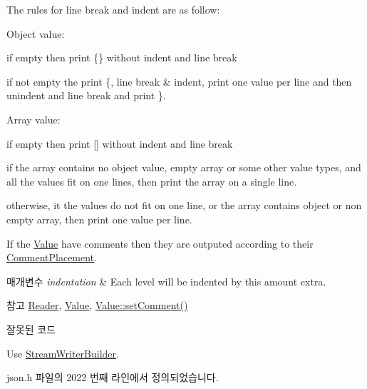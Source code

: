 The rules for line break and indent are as follow\+:
\begin{DoxyItemize}
\item Object value\+:
\begin{DoxyItemize}
\item if empty then print \{\} without indent and line break
\item if not empty the print \textquotesingle{}\{\textquotesingle{}, line break \& indent, print one value per line and then unindent and line break and print \textquotesingle{}\}\textquotesingle{}.
\end{DoxyItemize}
\item Array value\+:
\begin{DoxyItemize}
\item if empty then print \mbox{[}\mbox{]} without indent and line break
\item if the array contains no object value, empty array or some other value types, and all the values fit on one lines, then print the array on a single line.
\item otherwise, it the values do not fit on one line, or the array contains object or non empty array, then print one value per line.
\end{DoxyItemize}
\end{DoxyItemize}

If the \hyperlink{class_json_1_1_value}{Value} have comments then they are outputed according to their \hyperlink{namespace_json_a4fc417c23905b2ae9e2c47d197a45351}{Comment\+Placement}.


\begin{DoxyParams}{매개변수}
{\em indentation} & Each level will be indented by this amount extra. \\
\hline
\end{DoxyParams}
\begin{DoxySeeAlso}{참고}
\hyperlink{class_json_1_1_reader}{Reader}, \hyperlink{class_json_1_1_value}{Value}, \hyperlink{class_json_1_1_value_a29f3a30f7e5d3af6f38d57999bf5b480}{Value\+::set\+Comment()} 
\end{DoxySeeAlso}
\begin{DoxyRefDesc}{잘못된 코드}
\item[\hyperlink{deprecated__deprecated000010}{잘못된 코드}]Use \hyperlink{class_json_1_1_stream_writer_builder}{Stream\+Writer\+Builder}. \end{DoxyRefDesc}


json.\+h 파일의 2022 번째 라인에서 정의되었습니다.



